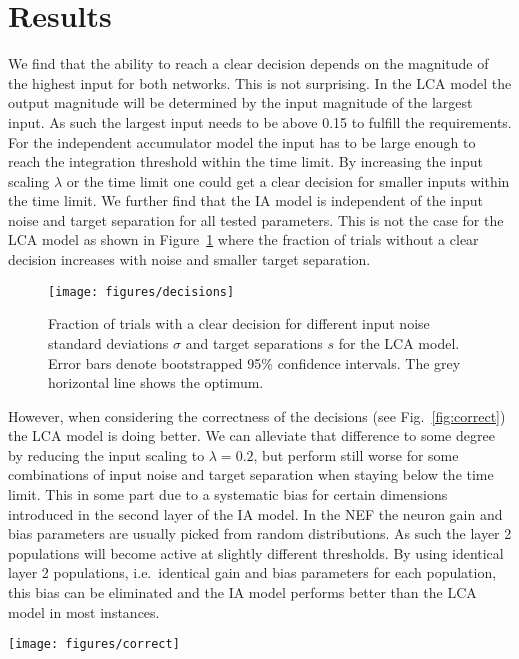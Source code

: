 \documentclass[10pt,letterpaper]{article}
\begin{document}
\section{Results}
We find that the ability to reach a clear decision depends on the magnitude of 
the highest input for both networks. This is not surprising. In the LCA model 
the output magnitude will be determined by the input magnitude of the largest 
input.  As such the largest input needs to be above 0.15 to fulfill the 
requirements. For the independent accumulator model the input has to be large 
enough to reach the integration threshold within the time limit. By increasing 
the input scaling $\lambda$ or the time limit one could get a clear decision for 
smaller inputs within the time limit. We further find that the IA model is 
independent of the input noise and target separation for all tested parameters.  
This is not the case for the LCA model as shown in Figure~\ref{fig:decisions} 
where the fraction of trials without a clear decision increases with noise and 
smaller target separation.
\begin{figure}
    \centering
    \texttt{[image: figures/decisions]}
    \caption{Fraction of trials with a clear decision for different input noise 
        standard deviations $\sigma$ and target separations $s$ for the LCA 
        model. Error bars denote bootstrapped 95\% confidence intervals.  The 
        grey horizontal line shows the optimum.}\label{fig:decisions}
\end{figure}

However, when considering the correctness of the decisions (see 
Fig.~\ref{fig:correct}) the LCA model is doing better. We can alleviate that 
difference to some degree by reducing the input scaling to $\lambda = 0.2$, but 
perform still worse for some combinations of input noise and target separation 
when staying below the time limit. This in some part due to a systematic bias 
for certain dimensions introduced in the second layer of the IA model. In the 
NEF the neuron gain and bias parameters are usually picked from random 
distributions. As such the layer 2 populations will become active at slightly 
different thresholds. By using identical layer 2 populations, i.e.~identical 
gain and bias parameters for each population, this bias can be eliminated and 
the IA model performs better than the LCA model in most instances.
\begin{figure*}
    \centering
    \texttt{[image: figures/correct]}
    \caption{Fraction of correct trials for different input noise standard 
        deviations $\sigma$, target separations $s$, and models.  Error bars 
        denote bootstrapped 95\% confidence intervals. The grey horizontal line 
        shows the optimum.}\label{fig:correct}
\end{figure*}
\end{document}

